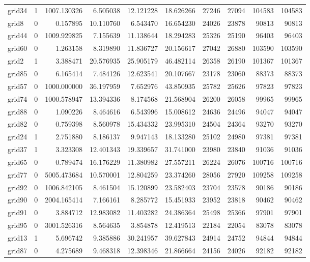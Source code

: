 \begin{longtable}{|l|r|r|r|r|r|r|r|r|r|}
grid34 & 1 & 1007.130326 & 6.505038 & 12.121228 & 18.626266 & 27246 & 27094 & 104583 & 104583 \\
grid8 & 0 & 0.157895 & 10.110760 & 6.543470 & 16.654230 & 24026 & 23878 & 90813 & 90813 \\
grid44 & 0 & 1009.929825 & 7.155639 & 11.138644 & 18.294283 & 25326 & 25190 & 96403 & 96403 \\
grid60 & 0 & 1.263158 & 8.319890 & 11.836727 & 20.156617 & 27042 & 26880 & 103590 & 103590 \\
grid2 & 1 & 3.388471 & 20.576935 & 25.905179 & 46.482114 & 26358 & 26190 & 101367 & 101367 \\
grid85 & 0 & 6.165414 & 7.484126 & 12.623541 & 20.107667 & 23178 & 23060 & 88373 & 88373 \\
grid57 & 0 & 1000.000000 & 36.197959 & 7.652976 & 43.850935 & 25782 & 25626 & 97823 & 97823 \\
grid74 & 0 & 1000.578947 & 13.394336 & 8.174568 & 21.568904 & 26200 & 26058 & 99965 & 99965 \\
grid88 & 0 & 1.090226 & 8.464616 & 6.543996 & 15.008612 & 24636 & 24496 & 94047 & 94047 \\
grid82 & 0 & 0.759398 & 8.560978 & 15.434332 & 23.995310 & 24504 & 24364 & 93270 & 93270 \\
grid24 & 1 & 2.751880 & 8.186137 & 9.947143 & 18.133280 & 25102 & 24980 & 97381 & 97381 \\
grid37 & 1 & 3.323308 & 12.401343 & 19.339657 & 31.741000 & 23980 & 23840 & 91036 & 91036 \\
grid65 & 0 & 0.789474 & 16.176229 & 11.380982 & 27.557211 & 26224 & 26076 & 100716 & 100716 \\
grid77 & 0 & 5005.473684 & 10.570001 & 12.804259 & 23.374260 & 28056 & 27920 & 109258 & 109258 \\
grid92 & 0 & 1006.842105 & 8.461504 & 15.120899 & 23.582403 & 23704 & 23578 & 90186 & 90186 \\
grid90 & 0 & 2004.165414 & 7.166161 & 8.285772 & 15.451933 & 23952 & 23818 & 90462 & 90462 \\
grid91 & 0 & 3.884712 & 12.983082 & 11.403282 & 24.386364 & 25498 & 25366 & 97901 & 97901 \\
grid95 & 0 & 3001.526316 & 8.564635 & 3.854878 & 12.419513 & 22184 & 22054 & 83078 & 83078 \\
grid13 & 1 & 5.696742 & 9.385886 & 30.241957 & 39.627843 & 24914 & 24752 & 94844 & 94844 \\
grid87 & 0 & 4.275689 & 9.468318 & 12.398346 & 21.866664 & 24156 & 24026 & 92182 & 92182 \\

\end{longtable}
